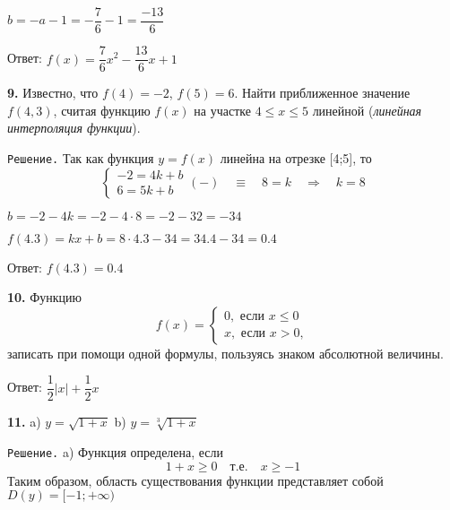\documentclass[12pt]{article}
\begin{document}
$b = -a-1 = -\dfrac{7}{6}-1 = \dfrac{-13}{6}$

\vspace{2mm}\hspace{-4mm}Ответ: $f(x) = \dfrac{7}{6}x^2-\dfrac{13}{6}x+1$\vspace{2mm}

{\bf 9.} Известно, что $f(4)=-2$, $f(5)=6$. Найти приближенное значение $f(4,3)$, считая функцию $f(x)$ на участке $4\le x\le 5$ линейной ({\it линейная интерполяция функции}).
	
{\tt Решение.} Так как функция $y=f(x)$ линейна на отрезке [4;5], то
	\begin{equation*}
	\begin{cases}
		-2 = 4k+b \\
		6 = 5k+b
	\end{cases}(-)\quad \equiv \quad
	8 = k \quad\Longrightarrow\quad k =8
	\end{equation*}
	
	$b = -2-4k = -2-4\cdot8 = -2-32 = -34$
	\vspace{2mm}
	
	$f(4.3) = kx+b = 8\cdot4.3-34 = 34.4-34 = 0.4$
	
	\vspace{2mm}\hspace{-4mm}Ответ: $f(4.3) = 0.4$\vspace{2mm}
	
	{\bf 10.} Функцию
	\begin{equation*}
		f(x) = 
		\begin{cases}
			0, \text{ если } x\le 0\\
			x, \text{ если } x>0,
		\end{cases}
	\end{equation*}
	записать при помощи одной формулы, пользуясь знаком абсолютной величины.
	
	\vspace{2mm}\hspace{-4mm}Ответ: $\dfrac{1}{2}|x|+\dfrac{1}{2}x$
	\vspace{2mm}
	
	\hspace{-5mm}{\tt Определить области существования функций(11-21): }
	
	{\bf 11.} a) $y = \sqrt{1+x}$ \quad b) $y = \sqrt[3]{1+x}$
	
	{\tt Решение.} a) Функция определена, если 
	\[
		1+x\ge 0\quad \text{т.е.}\quad x\ge-1
	\]
	Таким образом, область существования функции представляет собой  $D(y) = [-1;+\infty)$
	
\end{document}
